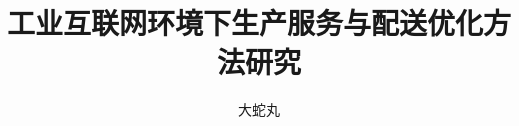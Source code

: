 \documentclass[doctor]{hnuthesis}
\title{工业互联网环境下生产服务与配送优化方法研究}
\author{大蛇丸}
\begin{document}
\maketitle


\tableofcontents
\begingroup
    \renewcommand*{\addvspace}[1]{}
        \listoffigures
        \newpage

        \listoftables
        \newpage
\endgroup

\mainmatter





\appendix



\backmatter

\end{document}
